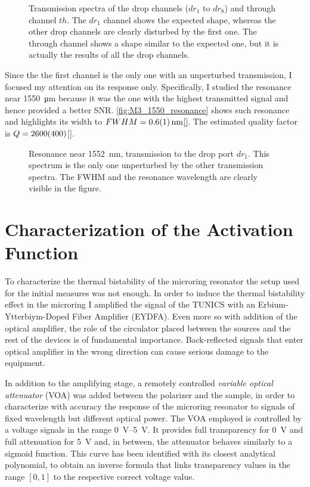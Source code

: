 \begin{figure}[htbp]
	\centering
%	
%	
	
	\caption{
		Transmission spectra of the drop channels ($dr_1$ to $dr_8$) and through channel $th$.
		The $dr_1$ channel shows the expected shape, whereas the other drop channels are clearly disturbed by the first one.
		The through channel shows a shape similar to the expected one, but it is actually the results of all the drop channels.
	}
	\label{fig:M3sweep}
\end{figure}

Since the the first channel is the only one with an unperturbed transmission, I focused my attention on its response only.
Specifically, I studied the resonance near \SI{1550}{\um} because it was the one with the highest transmitted signal and hence provided a better SNR.
\autoref{fig:M3_1550_resonance} shows such resonance and highlights its width to $FWHM=\SI{0.6+-0.1}{\nm}$\ref{}.
The estimated quality factor is $Q=\num{2600+-400}$\ref{}.

\begin{figure}[htbp]
	\centering
	
	\caption{
		Resonance near \SI{1552}{\nm}, transmission to the drop port $dr_1$.
		This spectrum is the only one unperturbed by the other transmission spectra.
		The FWHM and the resonance wavelength are clearly visible in the figure.
	}
	\label{fig:M3_1550_resonance}
\end{figure}

\section{Characterization of the Activation Function}
\label{sec:Characterization_of_the_Activation_Function}
To characterize the thermal bistability of the microring resonator the setup used for the initial measures was not enough.
In order to induce the thermal bistability effect in the microring I amplified the signal of the TUNICS with an Erbium-Ytterbiym-Doped Fiber Amplifier (EYDFA).
Even more so with addition of the optical amplifier, the role of the circulator placed between the sources and the rest of the devices is of fundamental importance.
Back-reflected signals that enter optical amplifier in the wrong direction can cause serious damage to the equipment.

In addition to the amplifying stage, a remotely controlled \textit{variable optical attenuator} (VOA) was added between the polarizer and the sample, in order to characterize with accuracy the response of the microring resonator to signals of fixed wavelength but different optical power.
The VOA employed is controlled by a voltage signals in the range \SIrange{0}{5}{\V}.
It provides full transparency for \SI{0}{\V} and full attenuation for \SI{5}{\V} and, in between, the attenuator behaves similarly to a sigmoid function.
This curve has been identified with its closest analytical polynomial, to obtain an inverse formula that links transparency values in the range $[0,1]$ to the respective correct voltage value.

